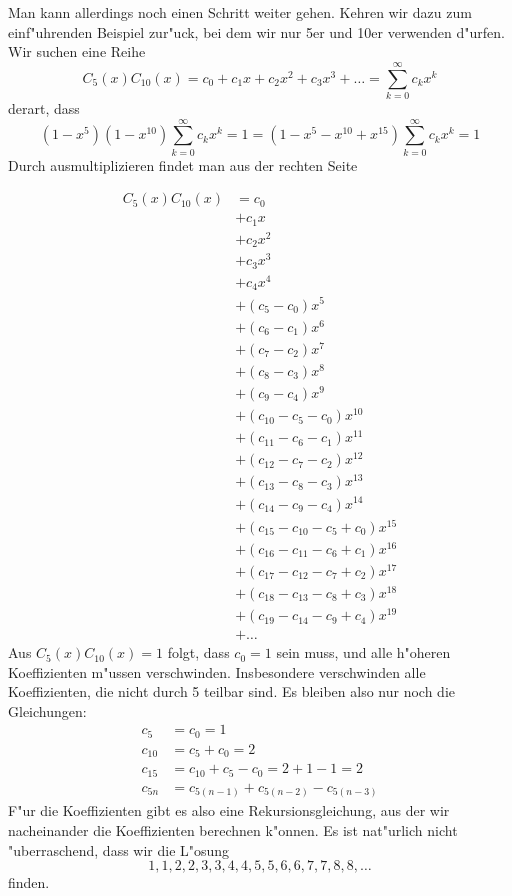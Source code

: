 Man kann allerdings noch einen Schritt weiter gehen. Kehren wir dazu zum
einf"uhrenden Beispiel zur"uck, bei dem wir nur 5er und 10er verwenden
d"urfen. Wir suchen eine Reihe
\[
C_5(x)C_{10}(x)=c_0+c_1x+c_2x^2+c_3x^3+\dots=\sum_{k=0}^\infty c_kx^k
\]
derart, dass
\[
(1-x^5)(1-x^{10}) \sum_{k=0}^\infty c_kx^k=1
=
(1-x^5-x^{10}+x^{15}) \sum_{k=0}^\infty c_kx^k=1
\]
Durch ausmultiplizieren findet man aus der rechten Seite

\begin{align*}
C_5(x)C_{10}(x)&=c_0\\
&+c_1x\\
&+c_2x^2\\
&+c_3x^3\\
&+c_4x^4\\
&+(c_5-c_0)x^5\\
&+(c_6-c_1)x^6\\
&+(c_7-c_2)x^7\\
&+(c_8-c_3)x^8\\
&+(c_9-c_4)x^9\\
&+(c_{10} - c_5 -c_0)x^{10}\\
&+(c_{11} - c_6 -c_1)x^{11}\\
&+(c_{12} - c_7 -c_2)x^{12}\\
&+(c_{13} - c_8 -c_3)x^{13}\\
&+(c_{14} - c_9 -c_4)x^{14}\\
&+(c_{15} - c_{10} - c_{5} +c_0)x^{15}\\
&+(c_{16} - c_{11} - c_{6} +c_1)x^{16}\\
&+(c_{17} - c_{12} - c_{7} +c_2)x^{17}\\
&+(c_{18} - c_{13} - c_{8} +c_3)x^{18}\\
&+(c_{19} - c_{14} - c_{9} +c_4)x^{19}\\
&+\dots
\end{align*}
Aus $C_{5}(x)C_{10}(x)=1$ folgt, dass $c_0=1$ sein muss, und alle
h"oheren Koeffizienten m"ussen verschwinden. Insbesondere verschwinden
alle Koeffizienten, die nicht durch 5 teilbar sind. Es bleiben also nur noch
die Gleichungen:
\begin{align*}
c_5&=c_0=1\\
c_{10}&=c_5+c_0=2\\
c_{15}&=c_{10}+c_{5}-c_0=2 + 1 - 1=2\\
c_{5n}&=c_{5(n-1)}+c_{5(n-2)}-c_{5(n-3)}
\end{align*}
F"ur die Koeffizienten gibt es also eine Rekursionsgleichung, aus der wir
nacheinander die Koeffizienten berechnen k"onnen. Es ist nat"urlich nicht
"uberraschend, dass wir die L"osung
\[
1, 1, 2, 2, 3, 3, 4, 4, 5, 5, 6, 6, 7, 7, 8, 8, \dots
\]
finden.

